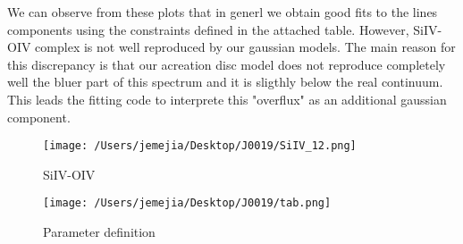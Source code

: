 \documentclass[usenatbib]{mn2e}
\begin{document}
We can observe from these plots that in generl we obtain good fits to the lines components using the constraints defined in the attached table. However, SiIV-OIV complex is not well reproduced by our gaussian models.   The main reason for this discrepancy is that our acreation disc model does not reproduce completely well the bluer part of this spectrum and it is sligthly below the real continuum. This leads the fitting code to interprete  this "overflux" as an additional gaussian component.

\begin{figure*}
\begin{center}
\texttt{[image: /Users/jemejia/Desktop/J0019/SiIV\_12.png]}
\vspace{5mm}
\end{center} 
\caption{SiIV-OIV \label{fig:landscape}}   
\end{figure*}

\begin{figure*}
\begin{center}
\texttt{[image: /Users/jemejia/Desktop/J0019/tab.png]}
\vspace{5mm}
\end{center} 
\caption{Parameter definition \label{fig:landscape}}   
\end{figure*}
\end{document}
